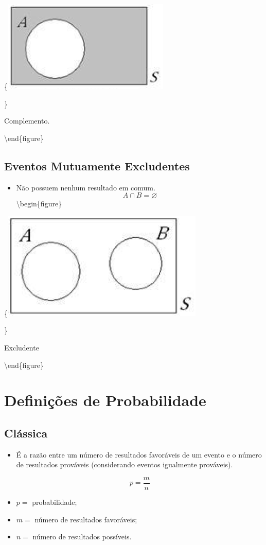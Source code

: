 \documentclass[
]{book}
\providecommand{\tightlist}{%
  \setlength{\itemsep}{0pt}\setlength{\parskip}{0pt}}
\begin{document}
\{\centering \includegraphics[width=0.25\linewidth]{figuras/complemento}

\}

\caption{Complemento.}

\label{fig:unnamed-chunk-3}
\textbackslash end\{figure\}

\hypertarget{eventos-mutuamente-excludentes}{%
\subsection{Eventos Mutuamente Excludentes}\label{eventos-mutuamente-excludentes}}

\begin{itemize}
\tightlist
\item
  Não possuem nenhum resultado em comum.
  \[A \cap B = \varnothing\]
  \textbackslash begin\{figure\}
\end{itemize}

\{\centering \includegraphics[width=0.25\linewidth]{figuras/excludente}

\}

\caption{Excludente}

\label{fig:unnamed-chunk-4}
\textbackslash end\{figure\}

\hypertarget{definiuxe7uxf5es-de-probabilidade-1}{%
\section{Definições de Probabilidade}\label{definiuxe7uxf5es-de-probabilidade-1}}

\hypertarget{cluxe1ssica}{%
\subsection{Clássica}\label{cluxe1ssica}}

\begin{itemize}
\item
  É a razão entre um número de resultados favoráveis de um evento e o número de resultados prováveis (considerando eventos igualmente prováveis).

  \[ p=\dfrac{m}{n} \]
\item
  \(p =\) probabilidade;
\item
  \(m =\) número de resultados favoráveis;
\item
  \(n =\) número de resultados possíveis.
\end{itemize}
\end{document}

